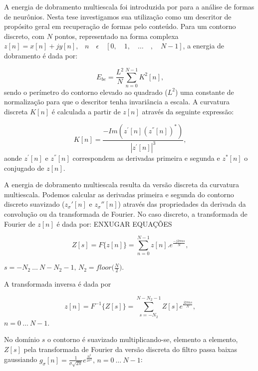 A energia de dobramento multiescala foi introduzida por  para a análise de formas de neurônios. Nesta tese investigamos sua utilização como um descritor de propósito geral em recuperação de formas pelo conteúdo. Para um contorno discreto, com $N$ pontos, representado na forma complexa $z[n] = x[n]+jy[n] \text{,} \quad n \quad \epsilon \quad [0, \quad 1, \quad \ldots \quad , \quad N-1]$, a energia de dobramento é dada por: 

\begin{equation}
E_{be} = \frac{L^{2}}{N}\sum_{n=0}^{N-1}K^{2}[n]\text{,}
\label{eq:ebe}
\end{equation}
\noindent
sendo o perímetro do contorno elevado ao quadrado ($L^2$) uma constante de normalização para que o descritor tenha invariância a escala. A curvatura discreta $K[n]$ é calculada a partir de $z[n]$ através da seguinte expressão:

\begin{equation}
K[n] = \frac{-Im(z^{'}[n](z^{''}[n])^{*})}{|z^{'}[n]|^3} \text{,}
\label{eq:kn}
\end{equation}
\noindent
aonde $z^{'}[n]$ e $z^{''}[n]$ correspondem as derivadas primeira e segunda e $z^{*}[n]$ o conjugado de $z[n]$. 

A energia de dobramento multiescala resulta da versão discreta da curvatura multiescala. Podemos calcular as derivadas primeira e segunda do contorno discreto suavizado ($z_\sigma'[n]$ e $z_\sigma''[n]$) através das propriedades da derivada da convolução ou da transformada de Fourier. No caso discreto, a transformada de Fourier de $z[n]$ é dada por: \color{red}ENXUGAR EQUAÇÕES \color{black} 

\begin{equation}
Z[s] = F\big\{z[n]\big\} = \sum\limits_{n=0}^{N-1}z[n].e^{\frac{-j2\pi ns}{N}} \text{,}
\end{equation}

$s = -N_{2}\: \ldots \: N-N_{2}-1\text{, }N_{2}=floor\big(\frac{N}{2}\big)$.

 A transformada inversa é dada por  

\begin{equation}
z[n] = F^{-1}\big\{Z[s]\big\} = \sum\limits_{s = -N_{2}}^{N-N_{2}-1}Z[s]e^{\frac{j2\pi n s}{N}}\text{,}
\end{equation}
 $ n = 0\: \ldots \: N-1$.
  
No domínio $s$ o contorno é suavizado multiplicando-se, elemento a elemento, $Z[s]$ pela transformada de Fourier da versão discreta do filtro passa baixas gaussiando $g_\sigma[n] = \frac{1}{\sigma\sqrt{2\pi}}e^{\frac{n^2}{2\sigma^2}}\text{, } 
n = 0 \: \ldots \: N-1$:


